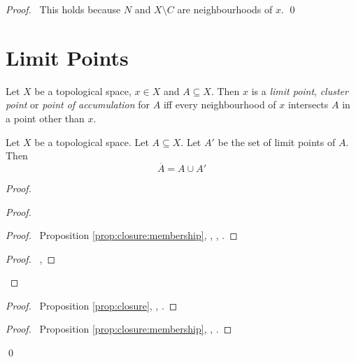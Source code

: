 \begin{proof}
  \pf\ This holds because $N$ and $X \setminus C$ are neighbourhoods of $x$. \qed
\end{proof}

\section{Limit Points}

\begin{df}
  Let $X$ be a topological space, $x \in X$ and $A \subseteq X$. Then $x$ is a \emph{limit point}, \emph{cluster point} or \emph{point of accumulation} for $A$ iff every neighbourhood of $x$ intersects $A$ in a point other than $x$.
\end{df}

\begin{prop}
  \label{prop:limit_points:closure}
  Let $X$ be a topological space. Let $A \subseteq X$. Let $A'$ be the set of limit points of $A$. Then
  \[ \overline{A} = A \cup A' \]
\end{prop}

\begin{proof}
  \pf
  \begin{proof}
    \pf
    \begin{proof}
      \pf\ Proposition \ref{prop:closure:membership}, , , .
    \end{proof}
    \begin{proof}
      \pf\ , 
    \end{proof}
  \end{proof}
  \begin{proof}
    \pf\ Proposition \ref{prop:closure}, , .
  \end{proof}
  \begin{proof}
    \pf\ Proposition \ref{prop:closure:membership}, , .
  \end{proof}
  \qed
\end{proof}

